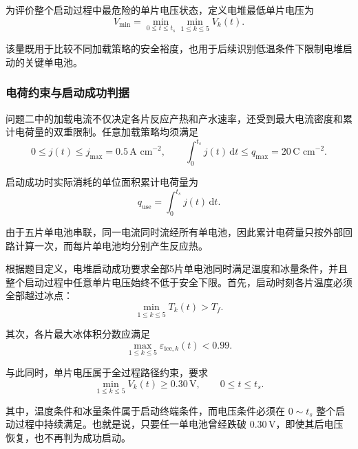 \documentclass[bwprint]{gmcmthesis}
\numberwithin{equation}{section}
\numberwithin{figure}{section}
\begin{document}
 为评价整个启动过程中最危险的单片电压状态，定义电堆最低单片电压为
\begin{equation}
V_{\text{min}} = \min_{0 \le t \le t_s} \min_{1 \le k \le 5} V_k(t). \label{eq:src:5-42}
\end{equation}

 该量既用于比较不同加载策略的安全裕度，也用于后续识别低温条件下限制电堆启动的关键单电池。

\subsubsection{电荷约束与启动成功判据}

 问题二中的加载电流不仅决定各片反应产热和产水速率，还受到最大电流密度和累计电荷量的双重限制。任意加载策略均须满足
\begin{equation}
0 \leq j(t) \leq j_{\text{max}} = 0.5 \, \text{A cm}^{-2}, \qquad \int_0^{t_s} j(t) \, \mathrm{d}t \leq q_{\text{max}} = 20 \, \text{C cm}^{-2}. \label{eq:src:5-43}
\end{equation}

 启动成功时实际消耗的单位面积累计电荷量为
\begin{equation}
q_{\text{use}} = \int_0^{t_s} j(t) \, \mathrm{d}t. \label{eq:src:5-44}
\end{equation}

 由于五片单电池串联，同一电流同时流经所有单电池，因此累计电荷量只按外部回路计算一次，而每片单电池均分别产生反应热。

 根据题目定义，电堆启动成功要求全部5片单电池同时满足温度和冰量条件，并且整个启动过程中任意单片电压始终不低于安全下限。首先，启动时刻各片温度必须全部越过冰点：
\begin{equation}
\min_{1 \leq k \leq 5} T_k(t) > T_f. \label{eq:src:5-45}
\end{equation}

 其次，各片最大冰体积分数应满足
\begin{equation}
\max_{1 \leq k \leq 5} \varepsilon_{\text{ice},k}(t) < 0.99. \label{eq:src:5-46}
\end{equation}

 与此同时，单片电压属于全过程路径约束，要求
\begin{equation}
\min_{1 \leq k \leq 5} V_k(t) \geq 0.30 \, \text{V}, \qquad 0 \leq t \leq t_s. \label{eq:src:5-47}
\end{equation}

 其中，温度条件和冰量条件属于启动终端条件，而电压条件必须在 \(0 \sim t_s\) 整个启动过程中持续满足。也就是说，只要任一单电池曾经跌破 \(0.30 \, \text{V}\)，即使其后电压恢复，也不再判为成功启动。
\end{document}
